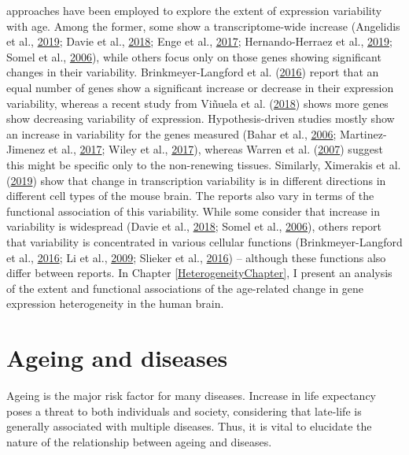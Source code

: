 \documentclass[12pt,twoside]{unicam}
\begin{document}
approaches have been employed to explore the extent of expression variability with age. Among the former, some show a transcriptome-wide increase (Angelidis et al., \protect\hyperlink{ref-Angelidis2019}{2019}; Davie et al., \protect\hyperlink{ref-Davie2018}{2018}; Enge et al., \protect\hyperlink{ref-Enge2017}{2017}; Hernando-Herraez et al., \protect\hyperlink{ref-Hernando-Herraez2019}{2019}; Somel et al., \protect\hyperlink{ref-Somel2006}{2006}), while others focus only on those genes showing significant changes in their variability. Brinkmeyer-Langford et al. (\protect\hyperlink{ref-Brinkmeyer-Langford2016}{2016}) report that an equal number of genes show a significant increase or decrease in their expression variability, whereas a recent study from Viñuela et al. (\protect\hyperlink{ref-Vinuela2018}{2018}) shows more genes show decreasing variability of expression. Hypothesis-driven studies mostly show an increase in variability for the genes measured (Bahar et al., \protect\hyperlink{ref-Bahar2006}{2006}; Martinez-Jimenez et al., \protect\hyperlink{ref-Martinez-Jimenez2017}{2017}; Wiley et al., \protect\hyperlink{ref-Wiley2017}{2017}), whereas Warren et al. (\protect\hyperlink{ref-Warren2007}{2007}) suggest this might be specific only to the non-renewing tissues. Similarly, Ximerakis et al. (\protect\hyperlink{ref-Ximerakis2019}{2019}) show that change in transcription variability is in different directions in different cell types of the mouse brain. The reports also vary in terms of the functional association of this variability. While some consider that increase in variability is widespread (Davie et al., \protect\hyperlink{ref-Davie2018}{2018}; Somel et al., \protect\hyperlink{ref-Somel2006}{2006}), others report that variability is concentrated in various cellular functions (Brinkmeyer-Langford et al., \protect\hyperlink{ref-Brinkmeyer-Langford2016}{2016}; Li et al., \protect\hyperlink{ref-Li2009}{2009}; Slieker et al., \protect\hyperlink{ref-Slieker2016}{2016}) -- although these functions also differ between reports. In Chapter \ref{HeterogeneityChapter}, I present an analysis of the extent and functional associations of the age-related change in gene expression heterogeneity in the human brain.

\hypertarget{introAgeingDisease}{%
\section{Ageing and diseases}\label{introAgeingDisease}}

Ageing is the major risk factor for many diseases. Increase in life expectancy poses a threat to both individuals and society, considering that late-life is generally associated with multiple diseases. Thus, it is vital to elucidate the nature of the relationship between ageing and diseases.
\end{document}
